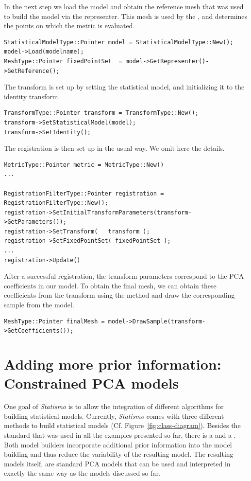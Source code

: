 \documentclass{InsightArticle}
\newcommand{\Statismo}{\emph{Statismo}\xspace}
\begin{document}
In the next step we load the model and obtain the reference mesh that was used to build the model via
the representer. This mesh is used by the , and determines the points on which the 
metric is evaluated. 
\begin{verbatim}
StatisticalModelType::Pointer model = StatisticalModelType::New();
model->Load(modelname);
MeshType::Pointer fixedPointSet  = model->GetRepresenter()->GetReference();
\end{verbatim}

The transform is set up by setting the statistical model, and initializing it to the identity transform. 
\begin{verbatim}
TransformType::Pointer transform = TransformType::New();
transform->SetStatisticalModel(model);
transform->SetIdentity();
\end{verbatim}

The registration is then set up in the usual way. We omit here the details.
\begin{verbatim}
MetricType::Pointer metric = MetricType::New()
...

RegistrationFilterType::Pointer registration = RegistrationFilterType::New();
registration->SetInitialTransformParameters(transform->GetParameters());
registration->SetTransform(   transform );
registration->SetFixedPointSet( fixedPointSet );
...
registration->Update()
\end{verbatim}

After a successful registration, the transform parameters correspond to the PCA coefficients in our model. 
To obtain the final mesh, we can obtain these coefficients from the transform using the method  
and draw the corresponding sample from the model. 
\begin{verbatim}
MeshType::Pointer finalMesh = model->DrawSample(transform->GetCoefficients());
\end{verbatim}


\section{Adding more prior information: Constrained PCA models }
One goal of \Statismo is to allow the integration of  different algorithms for building statistical models.
Currently, \Statismo comes with three different methods to build statistical models (Cf. Figure~\ref{fig:class-diagram}). Besides the standard  that was used in all the examples presented so far, there is a  \cite{TODO} and a  \cite{TODO}. Both model builders incorporate additional prior information into the model building and thus reduce the variability of the resulting model. The resulting models itself, are standard PCA models that can be used and interpreted in exactly the same way as the models discussed so far. 
\end{document}
